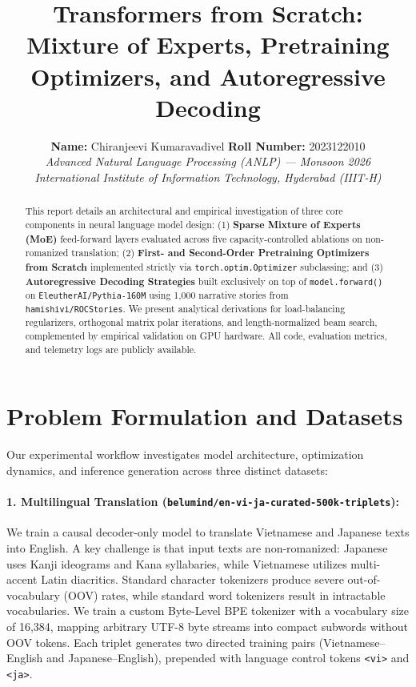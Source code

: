 \documentclass[11pt,a4paper]{article}
\title{\textbf{Transformers from Scratch: Mixture of Experts, Pretraining Optimizers, and Autoregressive Decoding}}
\author{
    \textbf{Name:} Chiranjeevi Kumaravadivel \quad \textbf{Roll Number:} 2023122010 \\
    \textit{Advanced Natural Language Processing (ANLP) --- Monsoon 2026} \\
    \textit{International Institute of Information Technology, Hyderabad (IIIT-H)}
}
\date{}
\begin{document}
\maketitle

\begin{abstract}
This report details an architectural and empirical investigation of three core components in neural language model design: (1) \textbf{Sparse Mixture of Experts (MoE)} feed-forward layers evaluated across five capacity-controlled ablations on non-romanized translation; (2) \textbf{First- and Second-Order Pretraining Optimizers from Scratch} implemented strictly via \texttt{torch.optim.Optimizer} subclassing; and (3) \textbf{Autoregressive Decoding Strategies} built exclusively on top of \texttt{model.forward()} on \texttt{EleutherAI/Pythia-160M} using 1,000 narrative stories from \texttt{hamishivi/ROCStories}. We present analytical derivations for load-balancing regularizers, orthogonal matrix polar iterations, and length-normalized beam search, complemented by empirical validation on GPU hardware. All code, evaluation metrics, and telemetry logs are publicly available.
\end{abstract}

\section{Problem Formulation and Datasets}

Our experimental workflow investigates model architecture, optimization dynamics, and inference generation across three distinct datasets:

\paragraph{1. Multilingual Translation (\texttt{belumind/en-vi-ja-curated-500k-triplets}):}
We train a causal decoder-only model to translate Vietnamese and Japanese texts into English. A key challenge is that input texts are non-romanized: Japanese uses Kanji ideograms and Kana syllabaries, while Vietnamese utilizes multi-accent Latin diacritics. Standard character tokenizers produce severe out-of-vocabulary (OOV) rates, while standard word tokenizers result in intractable vocabularies. We train a custom Byte-Level BPE tokenizer with a vocabulary size of 16,384, mapping arbitrary UTF-8 byte streams into compact subwords without OOV tokens. Each triplet generates two directed training pairs (Vietnamese--English and Japanese--English), prepended with language control tokens \texttt{<vi>} and \texttt{<ja>}.
\end{document}
